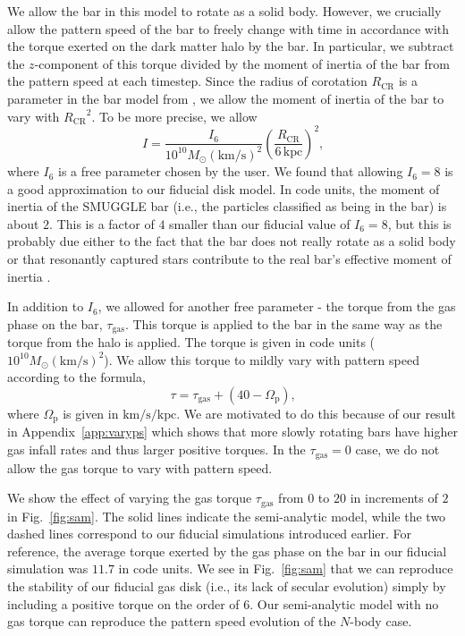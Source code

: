 \documentclass[twocolumn,linenumbers]{aastex631}
\newcommand{\RCR}{\ensuremath{R_{\textrm{CR}}}}
\newcommand{\kms}{\ensuremath{\textrm{km}/\textrm{s}}}
\newcommand{\SMUGGLE}{SMUGGLE}
\newcommand{\Msun}{\ensuremath{M_{\odot}}}
\begin{document}
We allow the bar in this model to rotate as a solid body. However, we crucially
allow the pattern speed of the bar to freely change with time in accordance with
the torque exerted on the dark matter halo by the bar. In particular, we
subtract the $z$-component of this torque divided by the moment of inertia of
the bar from the pattern speed at each timestep. Since the radius of corotation
\RCR{} is a parameter in the bar model from \citet{2022MNRAS.513..768C}, we
allow the moment of inertia of the bar to vary with ${\RCR}^2$. To be more
precise, we allow
\begin{equation}
I = \frac{I_6}{10^{10} \Msun (\kms)^2} \left( \frac{\RCR}{6\,\textrm{kpc}} \right)^2\textrm{,}
\end{equation}
where $I_6$ is a free parameter chosen by the user. We found that allowing
$I_6=8$ is a good approximation to our fiducial disk model. In code units, the
moment of inertia of the \SMUGGLE{} bar (i.e., the particles classified as being in
the bar) is about $2$. This is a factor of $4$ smaller than our fiducial value
of $I_6=8$, but this is probably due either to the fact that the bar does not
really rotate as a solid body or that resonantly captured stars contribute to
the real bar's effective moment of inertia \citep{1985MNRAS.213..451W}.

In addition to $I_6$, we allowed for another free parameter - the torque from
the gas phase on the bar, $\tau_{\textrm{gas}}$. This torque is applied to the
bar in the same way as the torque from the halo is applied. The torque is given
in code units ($10^{10}\Msun \left(\kms\right)^2$). We allow this torque to
mildly vary with pattern speed according to the formula,
\begin{equation}
\tau = \tau_{\textrm{gas}} + (40 - \Omega_{\textrm{p}})\textrm{,}
\end{equation}
where $\Omega_{\textrm{p}}$ is given in $\kms/\textrm{kpc}$. We are motivated to
do this because of our result in Appendix~\ref{app:varyps} which shows that more
slowly rotating bars have higher gas infall rates and thus larger positive
torques. In the $\tau_{\textrm{gas}}=0$ case, we do not allow the gas torque to
vary with pattern speed.

We show the effect of varying the gas torque $\tau_{\textrm{gas}}$ from $0$ to
$20$ in increments of $2$ in Fig.~\ref{fig:sam}. The solid lines indicate the
semi-analytic model, while the two dashed lines correspond to our fiducial
simulations introduced earlier. For reference, the average torque exerted by the
gas phase on the bar in our fiducial simulation was $11.7$ in code units. We see
in Fig.~\ref{fig:sam} that we can reproduce the stability of our fiducial gas
disk (i.e., its lack of secular evolution) simply by including a positive torque
on the order of $6$. Our semi-analytic model with no gas torque can reproduce
the pattern speed evolution of the $N$-body case.
\end{document}
